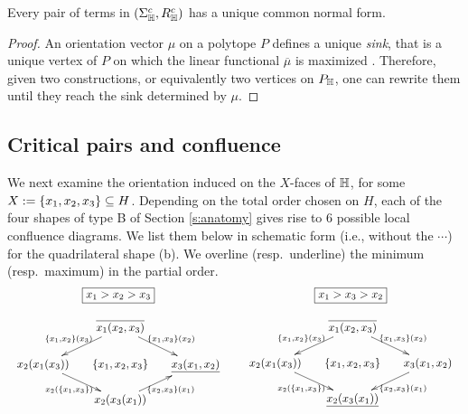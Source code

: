 \begin{thm}
  \label{thm:normal-form}
  Every pair of terms in $(\Sigma_{\mathbb H}^c,R_{\mathbb H}^c)$ has a unique common normal form. 
\end{thm}

\begin{proof}
  An orientation vector $\mu$ on a polytope $P$ defines a unique \emph{sink}, that is a unique vertex of $P$ on which the linear functional $\overline{\mu}$ is maximized \cite[Thm.~3.7]{Ziegler95}.
  Therefore, given two constructions, or equivalently two vertices on $P_{\mathbb H}$, one can rewrite them until they reach the sink determined by $\mu$. 
\end{proof}


\subsection{Critical pairs and confluence}
\label{ss:critical}

We next examine the orientation induced on the $X$-faces of $\hyper{H}$, for some $X:=\set{x_1,x_2,x_3}\inc H$. 
Depending on the total order chosen on $H$, each of the four shapes of type B of Section \ref{s:anatomy} gives rise to 6 possible local confluence diagrams. 
We list them below in schematic form (i.e., without the $\cdots$) for the quadrilateral shape (b).
We overline (resp.\ underline) the minimum (resp.\ maximum) in the partial order.
$$\begin{array}{ccc}
\boxed{x_1>x_2>x_3} && \boxed{x_1>x_3>x_2}\\
&&\\
\xymatrix @-1.65pc {&& \overline{x_1(x_2,x_3)} \ar @{->}[ddll]_{\set{x_1,x_2}(x_3)} \ar @{->}[ddrr]^{\set{x_1,x_3}(x_2)}&& \\
&&&&\\
x_2(x_1(x_3)) \ar @{->}[ddrr]_{x_2(\set{x_1,x_3})}&& \set{x_1,x_2,x_3}  && \underline{x_3(x_1,x_2)}\ar @{<-}[ddll]^{\set{x_2,x_3}(x_1)}\\
&&&&\\
&&  x_2(x_3(x_1))&&}
&&


\xymatrix @-1.65pc {&& \overline{x_1(x_2,x_3)} \ar @{->}[ddll]_{\set{x_1,x_2}(x_3)} \ar @{->}[ddrr]^{\set{x_1,x_3}(x_2)}&& \\
&&&&\\
x_2(x_1(x_3)) \ar @{->}[ddrr]_{x_2(\set{x_1,x_3})}&& \set{x_1,x_2,x_3}  && x_3(x_1,x_2)\ar @{->}[ddll]^{\set{x_2,x_3}(x_1)}\\
&&&&\\
&&  \underline{x_2(x_3(x_1))}&&}
\end{array}
$$

